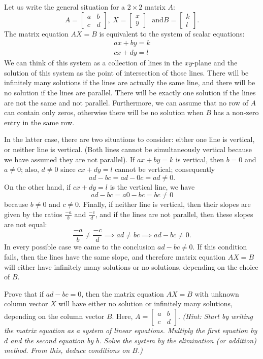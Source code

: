 \documentclass[12pt,letterpaper,twoside]{amsart}
\newcounter{exercise}
\newcommand{\exercise}{\bigskip \noindent {\large {\sc Exercise \arabic{exercise}:}} \addtocounter{exercise}{1}}
\newenvironment{exe}{\medskip \small \exercise}{\normalsize \medskip}
\newcommand{\startmatrix}{\left[ \begin{matrix}}
\newcommand{\finishmatrix}{\end{matrix} \right]}
\begin{document}
Let us write the general situation for a $2 \times 2$ matrix $A$:
\[ A = \left[ \begin{matrix} a & b \\ c & d \end{matrix} \right], \ X = \left[ \begin{matrix} x \\ y \end{matrix} \right]  \ \ \ \mbox{and} B = \left[ \begin{matrix} k \\ l \end{matrix} \right] .\]
The matrix equation $AX=B$ is equivalent to the system of scalar equations:
\begin{align*} ax+by = k \\ cx+dy=l \end{align*}
We can think of this system as a collection of lines in the $xy$-plane and the solution of this system as the point of intersection of those lines.  There will be infinitely many solutions if the lines are actually the same line, and there will be no solution if the lines are parallel.  There will be exactly one solution if the lines are not the same and not parallel.  Furthermore, we can assume that no row of $A$ can contain only zeros, otherwise there will be no solution when $B$ has a non-zero entry in the same row.

In the latter case, there are two situations to consider: either one line is vertical, or neither line is vertical.  (Both lines cannot be simultaneously vertical because we have assumed they are not parallel).  If $ax+by=k$ is vertical, then $b=0$ and $a \neq 0$; also, $d \neq 0$ since $cx+dy=l$ cannot be vertical; consequently 
\[ad-bc=ad-0c=ad \neq 0.\]
On the other hand, if $cx+dy=l$ is the vertical line, we have
\[ ad-bc = a0-bc =bc \neq 0\]
because $b\neq 0$ and $c \neq 0$.  Finally, if neither line is vertical, then their slopes are given by the ratios $\frac{-a}{b}$ and $\frac{-c}{d}$, and if the lines are not parallel, then these slopes are not equal:
\[ \frac{-a}{b} \neq \frac{-c}{d} \implies ad \neq bc \implies ad-bc \neq 0.\]
In every possible case we came to the conclusion $ad-bc \neq 0$.  If this condition fails, then the lines have the same slope, and therefore matrix equation $AX=B$ will either have infinitely many solutions or no solutions, depending on the choice of $B$.

\begin{exe} 
Prove that if $ad-bc=0$, then the matrix equation $AX=B$ with unknown column vector $X$ will have either no solution or infinitely many solutions, depending on the column vector $B$. Here, $A = \startmatrix a & b \\ c & d \finishmatrix$. {\it (Hint: Start by writing the matrix equation as a system of linear equations.  Multiply the first equation by $d$ and the second equation by $b$.  Solve the system by the elimination (or addition) method.  From this, deduce conditions on $B$.)}
\end{exe}
\end{document}
